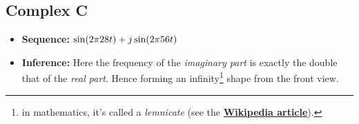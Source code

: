 \documentclass[../../course]{subfiles}
\begin{document}
\subsection{Complex C} \label{ssec:visCplxC}

\begin{itemize} [label=]

    \item \textbf{Sequence:} $\sin(2 \pi 28 t) + j \sin(2 \pi 56 t)$

    \item \textbf{Inference:} Here the frequency of the \emph{imaginary part} is exactly the
        double that of the \emph{real part}. Hence forming an infinity\footnote{in mathematics, it's
        called a \emph{lemnicate} (see the \textbf{\href{https://en.m.wikipedia.org/wiki/Lemniscate_of_Bernoulli}
        {Wikipedia article}}).} shape from the front view.

\end{itemize}

\vfill
\end{document}
